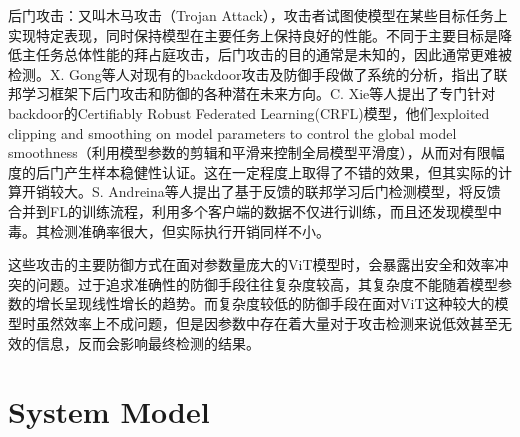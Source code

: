 \documentclass[conference]{IEEEtran}
\begin{document}
后门攻击：又叫木马攻击（Trojan Attack），攻击者试图使模型在某些目标任务上实现特定表现，同时保持模型在主要任务上保持良好的性能\cite{canYouBackdoor}。不同于主要目标是降低主任务总体性能的拜占庭攻击，后门攻击的目的通常是未知的，因此通常更难被检测。X. Gong等人对现有的backdoor攻击及防御手段做了系统的分析，指出了联邦学习框架下后门攻击和防御的各种潜在未来方向\cite{backdoorAndDefense}。C. Xie等人提出了专门针对backdoor的Certifiably Robust Federated Learning(CRFL)模型，他们exploited clipping and smoothing on model parameters to control the global model smoothness（利用模型参数的剪辑和平滑来控制全局模型平滑度），从而对有限幅度的后门产生样本稳健性认证\cite{backdoorAndDefense_robust}。这在一定程度上取得了不错的效果，但其实际的计算开销较大。S. Andreina等人提出了基于反馈的联邦学习后门检测模型，将反馈合并到FL的训练流程，利用多个客户端的数据不仅进行训练，而且还发现模型中毒\cite{backdoorAndDefense_feedback}。其检测准确率很大，但实际执行开销同样不小。

这些攻击的主要防御方式在面对参数量庞大的ViT模型时，会暴露出安全和效率冲突的问题。过于追求准确性的防御手段往往复杂度较高，其复杂度不能随着模型参数的增长呈现线性增长的趋势。而复杂度较低的防御手段在面对ViT这种较大的模型时虽然效率上不成问题，但是因参数中存在着大量对于攻击检测来说低效甚至无效的信息，反而会影响最终检测的结果。










\section{System Model}

\label{sec:model}
\end{document}
